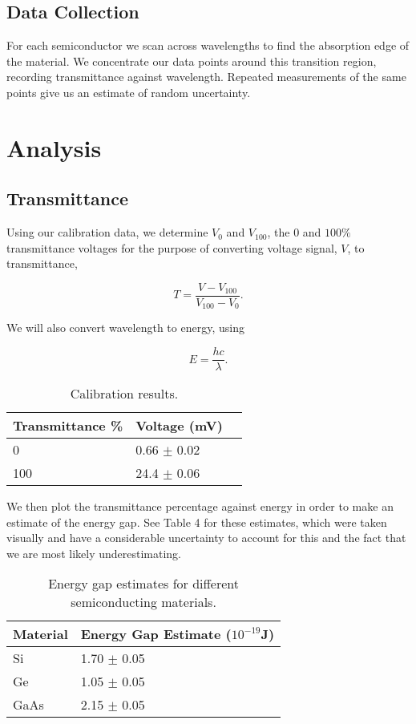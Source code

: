 \documentclass{article}
\begin{document}
\subsection{Data Collection}

For each semiconductor we scan across wavelengths to find the absorption edge of the material. We concentrate our data points around this transition region, recording transmittance against wavelength. Repeated measurements of the same points give us an estimate of random uncertainty.


\section{Analysis}
\subsection{Transmittance}

Using our calibration data, we determine $V_0$ and $V_{100}$, the 0 and $100\%$ transmittance voltages for the purpose of converting voltage signal, $V$, to transmittance,

\begin{equation}
	T = \frac{V - V_{100}}{V_{100} - V_0}.
\end{equation}

We will also convert wavelength to energy, using

\begin{equation}
	E = \frac{hc}{\lambda}.
\end{equation}

\begin{table}[]
\centering
\caption{Calibration results.}
\label{voltages}
\begin{tabular}{@{}lll@{}}
Transmittance \% & Voltage (mV) \\ \midrule
0                & 0.66 $\pm$ 0.02 \\
100              & 24.4  $\pm$ 0.06
\end{tabular}
\end{table}

We then plot the transmittance percentage against energy in order to make an estimate of the energy gap. See Table 4 for these estimates, which were taken visually and have a considerable uncertainty to account for this and the fact that we are most likely underestimating.

\begin{table}[]
\centering
\caption{Energy gap estimates for different semiconducting materials.}
\label{gap estimates}
\begin{tabular}{@{}ll@{}}
Material & Energy Gap Estimate ($10^{-19}$J) \\ \midrule
Si       & 1.70 $\pm$ 0.05                            \\
Ge       & 1.05 $\pm$ 0.05                          \\
GaAs     & 2.15 $\pm$ 0.05
\end{tabular}
\end{table}
\end{document}
